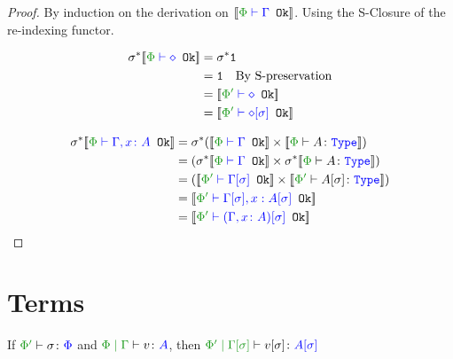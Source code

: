 \documentclass{report}
\begin{document}
\begin{framed}
    \begin{proof}
        By induction on the derivation on $\deno{\wellformedok{\P}{\G}}$. Using the S-Closure of the re-indexing functor.
        
        \case{\envnil}
        \begin{align*}
            \si\star\deno{\wellformedok{\P}{\nil}} &=\si\star\1\\
            & = \1\qt{By S-preservation}\\
            &= \deno{\wellformedok{\P'}{\nil}}\\
            &= \deno{\wellformedok{\P'}{\nil\ssi}}\\
        \end{align*}
        
        \case{\envextend}
        \begin{align*}
           \si\star\deno{\wellformedok{\P}{\gax}} &= \si\star(\deno{\wellformedok{\P}{\G}} \times \deno{\typerelation{\P}{A}{\type}}) \\
           & = (\si\star\deno{\wellformedok{\P}{\G}} \times \si\star\deno{\typerelation{\P}{A}{\type}})\\
            & = (\deno{\wellformedok{\P'}{\G\ssi}} \times \deno{\typerelation{\P'}{A\ssi}{\type}})\\
            & = \deno{\wellformedok{\P'}{\G\ssi, x: A\ssi}}\\
            & = \deno{\wellformedok{\P'}{(\gax)\ssi}}\\
        \end{align*}
    \end{proof}
\end{framed}



\section{Terms}
\begin{theorem}
    If $\typerelation{\P'}{\si}{\P}$ and $\gpetyperelation{v}{A}$, then $\etyperelation{\P'}{\G\ssi}{v\ssi}{A\ssi}$ 
\end{theorem}
\end{document}
